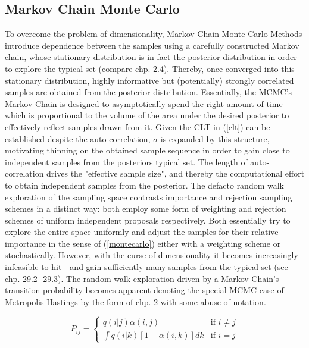 \documentclass[11pt]{article}
\begin{document}
        \subsection{Markov Chain Monte Carlo}
        To overcome the problem of dimensionality, Markov Chain Monte Carlo Methods introduce dependence between the samples using a carefully constructed Markov chain, whose stationary distribution is in fact the posterior distribution in order to explore the typical set (compare \citep{betancourt2017conceptual} chp. 2.4). Thereby, once converged into this stationary distribution, highly informative but (potentially) strongly correlated samples are obtained from the posterior distribution.
        Essentially, the MCMC's Markov Chain is designed to asymptotically spend the right amount of time - which is proportional to the volume of the area under the desired posterior to effectively reflect samples drawn from it. Given the CLT in (\ref{clt}) can be established despite the auto-correlation, $\sigma$ is expanded by this structure, motivating thinning on the obtained sample sequence in order to gain close to independent samples from the posteriors typical set. The length of auto-correlation drives the "effective sample size", and thereby the computational effort to obtain independent samples from the posterior.
        The defacto random walk exploration of the sampling space contrasts importance and rejection sampling schemes in a distinct way: both employ some form of weighting and rejection schemes of uniform independent proposals respectively. Both essentially try to explore the entire space uniformly and adjust the samples for their relative importance in the sense of (\ref{montecarlo}) either with a weighting scheme or stochastically. However, with the curse of dimensionality it becomes increasingly infeasible to hit - and gain sufficiently many samples from the typical set (see \citep{mackay2003information} chp. 29.2 -29.3).
        The random walk exploration driven by a Markov Chain's transition probability becomes apparent denoting the special MCMC case of Metropolis-Hastings \citep{} by the form of \citep{roberts1999note} chp. 2 with some abuse of notation.

        \begin{equation}
            P_{ij} = \begin{cases}
                        q(i|j)\alpha(i,j) & \text{if } i \neq j \\
                        \int q(i|k)[1-\alpha(i,k)] dk & \text{if } i = j
            \end{cases}
        \end{equation}
\end{document}
